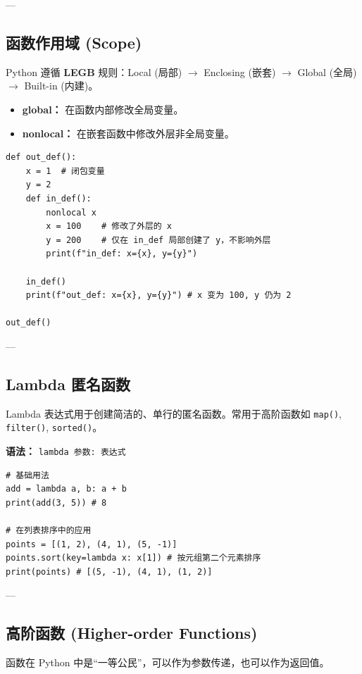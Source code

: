 \documentclass{article}
\begin{document}
---

\subsection{函数作用域 (Scope)}

Python 遵循 \textbf{LEGB} 规则：Local (局部) $\rightarrow$ Enclosing (嵌套) $\rightarrow$ Global (全局) $\rightarrow$ Built-in (内建)。

\begin{itemize}
    \item \textbf{global：} 在函数内部修改全局变量。
    \item \textbf{nonlocal：} 在嵌套函数中修改外层非全局变量。
\end{itemize}

\begin{lstlisting}
def out_def():
    x = 1  # 闭包变量
    y = 2
    def in_def():
        nonlocal x 
        x = 100    # 修改了外层的 x
        y = 200    # 仅在 in_def 局部创建了 y，不影响外层
        print(f"in_def: x={x}, y={y}")
        
    in_def()
    print(f"out_def: x={x}, y={y}") # x 变为 100, y 仍为 2

out_def()
\end{lstlisting}

---

\subsection{Lambda 匿名函数}

Lambda 表达式用于创建简洁的、单行的匿名函数。常用于高阶函数如 \texttt{map()}, \texttt{filter()}, \texttt{sorted()}。

\textbf{语法：} \texttt{lambda 参数: 表达式}

\begin{lstlisting}
# 基础用法
add = lambda a, b: a + b
print(add(3, 5)) # 8

# 在列表排序中的应用
points = [(1, 2), (4, 1), (5, -1)]
points.sort(key=lambda x: x[1]) # 按元组第二个元素排序
print(points) # [(5, -1), (4, 1), (1, 2)]
\end{lstlisting}

---

\subsection{高阶函数 (Higher-order Functions)}

函数在 Python 中是“一等公民”，可以作为参数传递，也可以作为返回值。
\end{document}
